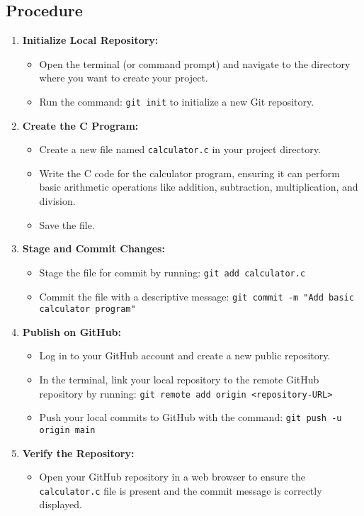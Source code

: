 \documentclass[a4paper,12pt]{report}
\begin{document}
\subsection*{Procedure}
\begin{enumerate}[label=\arabic*.]
    \item \textbf{Initialize Local Repository:}
    \begin{itemize}
        \item Open the terminal (or command prompt) and navigate to the directory where you want to create your project.
        \item Run the command: \texttt{git init} to initialize a new Git repository.
    \end{itemize}
    \item \textbf{Create the C Program:}
    \begin{itemize}
        \item Create a new file named \texttt{calculator.c} in your project directory.
        \item Write the C code for the calculator program, ensuring it can perform basic arithmetic operations like addition, subtraction, multiplication, and division.
        \item Save the file.
    \end{itemize}
    \item \textbf{Stage and Commit Changes:}
    \begin{itemize}
        \item Stage the file for commit by running: \texttt{git add calculator.c}
        \item Commit the file with a descriptive message: \texttt{git commit -m "Add basic calculator program"}
    \end{itemize}
    \item \textbf{Publish on GitHub:}
    \begin{itemize}
        \item Log in to your GitHub account and create a new public repository.
        \item In the terminal, link your local repository to the remote GitHub repository by running: \texttt{git remote add origin <repository-URL>}
        \item Push your local commits to GitHub with the command: \texttt{git push -u origin main}
    \end{itemize}
    \item \textbf{Verify the Repository:}
    \begin{itemize}
        \item Open your GitHub repository in a web browser to ensure the \texttt{calculator.c} file is present and the commit message is correctly displayed.
    \end{itemize}
\end{enumerate}
\newpage
\end{document}
